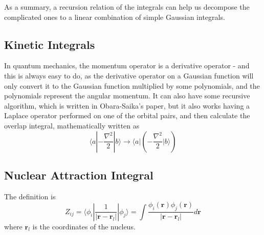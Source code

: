 \documentclass[12pt,a4paper,openany,twoside]{article}
\numberwithin{equation}{section}
\begin{document}
As a summary, a recursion relation of the integrals can help us decompose the complicated ones to a linear combination of simple Gaussian integrals.

\subsection{Kinetic Integrals}
In quantum mechanics, the momentum operator is a derivative operator - and this is always easy to do, as the derivative operator on a Gaussian function will only convert it to the Gaussian function multiplied by some polynomials, and the polynomials represent the angular momentum. It can also have some recursive algorithm, which is written in Obara-Saika's paper, but it also works having a Laplace operator performed on one of the orbital pairs, and then calculate the overlap integral, mathematically written as
\begin{equation}
    \langle a | - \frac{\nabla^2}{2} | b \rangle \rightarrow \langle a | (-\frac{\nabla^2}{2} | b \rangle)
\end{equation}

\subsection{Nuclear Attraction Integral}
The definition is
\begin{equation}
    Z_{ij} = \langle \phi_i | \frac{1}{|\boldsymbol{r} - \boldsymbol{r}_l|} |\phi_j \rangle = \int \frac{\phi_i(\boldsymbol{r}) \phi_j(\boldsymbol{r})}{|\boldsymbol{r} - \boldsymbol{r}_l|} d \boldsymbol{r}
\end{equation}
where $\boldsymbol{r}_l$ is the coordinates of the nucleus.
\end{document}
